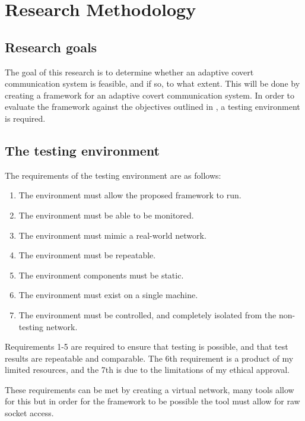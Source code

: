 \chapter{Research Methodology}

\section{Research goals}

The goal of this research is to determine whether an adaptive covert communication system is feasible, and if so, to what extent. This will be done by creating a framework for an adaptive covert communication system.
In order to evaluate the framework against the objectives outlined in , a testing environment is required.

\section{The testing environment}
\label{sec:testing_environment}

The requirements of the testing environment are as follows:

\begin{enumerate}
    \item The environment must allow the proposed framework to run.  %
    \item The environment must be able to be monitored. %
    \item The environment must mimic a real-world network. %
    \item The environment must be repeatable. %
    \item The environment components must be static. %
    \item The environment must exist on a single machine. %
    \item The environment must be controlled, and completely isolated from the non-testing network. %
\end{enumerate}


Requirements 1-5 are required to ensure that testing is possible, and that test results are repeatable and comparable. The 6th requirement is a product of my limited resources, and the 7th is due to the limitations of my ethical approval.

These requirements can be met by creating a virtual network, many tools allow for this but in order for the framework to be possible the tool must allow for raw socket access.

